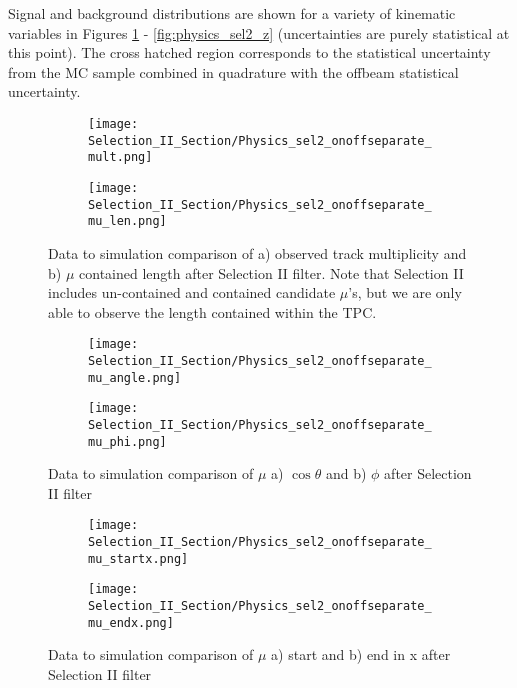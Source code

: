 Signal and background distributions are shown for a variety of kinematic variables in Figures \ref{fig:physics_sel2_mulen} - \ref{fig:physics_sel2_z} (uncertainties are purely statistical at this point). The cross hatched region corresponds to the statistical uncertainty from the MC sample combined in quadrature with the offbeam statistical uncertainty.

\begin{figure}[h!]
\centering
  \begin{subfigure}[t]{0.3\textwidth}
    \centering
\texttt{[image: Selection\_II\_Section/Physics\_sel2\_onoffseparate\_mult.png]}
    \caption{ }
  \end{subfigure} 
  \hspace{30 mm}
  \begin{subfigure}[t]{0.3\textwidth}
    \centering
\texttt{[image: Selection\_II\_Section/Physics\_sel2\_onoffseparate\_mu\_len.png]}
    \caption{ }
  \end{subfigure} 
 
\caption{ Data to simulation comparison of a) observed track multiplicity and b) $\mu$ contained length after Selection II filter.  Note that Selection II includes un-contained and contained candidate $\mu$'s, but we are only able to observe the length contained within the TPC.  }
\label{fig:physics_sel2_mulen}
\end{figure}

\begin{figure}[h!]
\centering
  \begin{subfigure}[t]{0.3\textwidth}
    \centering
\texttt{[image: Selection\_II\_Section/Physics\_sel2\_onoffseparate\_mu\_angle.png]}
   \caption{ }
  \end{subfigure} 
  \hspace{30 mm}
  \begin{subfigure}[t]{0.3\textwidth}
    \centering
    \texttt{[image: Selection\_II\_Section/Physics\_sel2\_onoffseparate\_mu\_phi.png]}
  \caption{ }
  \end{subfigure} 
\caption{ Data to simulation comparison of $\mu$ a) $\cos\theta$  and b) $\phi$ after Selection II filter }
\label{fig:physics_sel2_muphi}
\end{figure}

\begin{figure}[t!]
\centering
  \begin{subfigure}[t]{0.3\textwidth}
    \centering
\texttt{[image: Selection\_II\_Section/Physics\_sel2\_onoffseparate\_mu\_startx.png]}
   \caption{ }
  \end{subfigure} 
  \hspace{30 mm}
  \begin{subfigure}[t]{0.3\textwidth}
    \centering
\texttt{[image: Selection\_II\_Section/Physics\_sel2\_onoffseparate\_mu\_endx.png]}
   \caption{ }
  \end{subfigure} 
\caption{ Data to simulation comparison of $\mu$ a) start and b) end in x after Selection II filter }
\label{fig:physics_sel2_x}
\end{figure}

